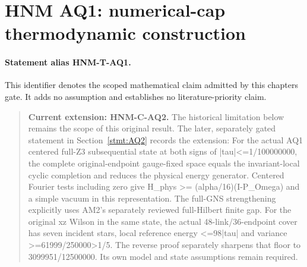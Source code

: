 \hypertarget{r29-aq1-aq1-forward-hnm-numerical-cap-thermodynamic-construction}{%
\section{HNM AQ1: numerical-cap thermodynamic construction\workstar}\label{r29:aq1:r29-aq1-aq1-forward-hnm-numerical-cap-thermodynamic-construction}}
\paragraph{Statement alias HNM-T-AQ1.}\label{stmt:AQ1} This identifier denotes the scoped mathematical claim admitted by this chapter\textquotesingle s gate. It adds no assumption and establishes no literature-priority claim.
\begin{quote}\small\textbf{Current extension: HNM-C-AQ2.} The historical limitation below remains the scope of this original result. The later, separately gated statement in Section~\ref{stmt:AQ2} records the extension: For the actual AQ1 centered full-Z3 subsequential state at both signs of |tau|<=1/100000000, the complete original-endpoint gauge-fixed space equals the invariant-local cyclic completion and reduces the physical energy generator. Centered Fourier tests including zero give H\_phys >= (alpha/16)(I-P\_Omega) and a simple vacuum in this representation. The full-GNS strengthening explicitly uses AM2's separately reviewed full-Hilbert finite gap. For the original xz Wilson in the same state, the actual 48-link/36-endpoint cover has seven incident stars, local reference energy <=98|tau| and variance >=61999/250000>1/5. The reverse proof separately sharpens that floor to 3099951/12500000. Its own model and state assumptions remain required.\end{quote}

